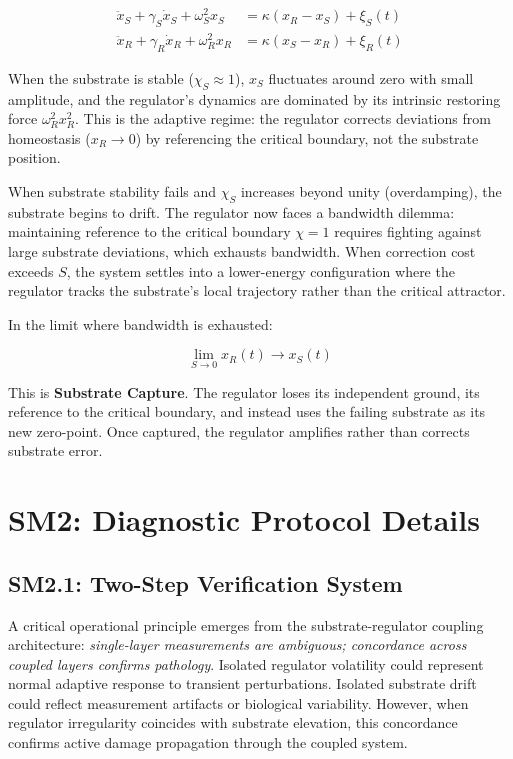 \documentclass[11pt,letterpaper]{article}
\begin{document}
\begin{align}
\ddot{x}_S + \gamma_S \dot{x}_S + \omega_S^2 x_S &= \kappa (x_R - x_S) + \xi_S(t) \\
\ddot{x}_R + \gamma_R \dot{x}_R + \omega_R^2 x_R &= \kappa (x_S - x_R) + \xi_R(t)
\end{align}

When the substrate is stable ($\chi_S \approx 1$), $x_S$ fluctuates around zero with small amplitude, and the regulator's dynamics are dominated by its intrinsic restoring force $\omega_R^2 x_R^2$. This is the adaptive regime: the regulator corrects deviations from homeostasis ($x_R \to 0$) by referencing the critical boundary, not the substrate position.

When substrate stability fails and $\chi_S$ increases beyond unity (overdamping), the substrate begins to drift. The regulator now faces a bandwidth dilemma: maintaining reference to the critical boundary $\chi = 1$ requires fighting against large substrate deviations, which exhausts bandwidth. When correction cost exceeds $S$, the system settles into a lower-energy configuration where the regulator tracks the substrate's local trajectory rather than the critical attractor.

In the limit where bandwidth is exhausted:

\begin{equation}
\lim_{S \to 0} x_R(t) \to x_S(t)
\end{equation}

This is \textbf{Substrate Capture}. The regulator loses its independent ground, its reference to the critical boundary, and instead uses the failing substrate as its new zero-point. Once captured, the regulator amplifies rather than corrects substrate error.

\section{SM2: Diagnostic Protocol Details}

\subsection{SM2.1: Two-Step Verification System}

A critical operational principle emerges from the substrate-regulator coupling architecture: \textit{single-layer measurements are ambiguous; concordance across coupled layers confirms pathology}. Isolated regulator volatility could represent normal adaptive response to transient perturbations. Isolated substrate drift could reflect measurement artifacts or biological variability. However, when regulator irregularity coincides with substrate elevation, this concordance confirms active damage propagation through the coupled system.
\end{document}
